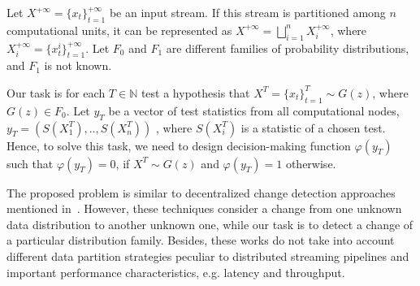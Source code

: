 \label {fs-short-model}

Let $X^{+\infty}=\{x_t\}_{t=1}^{+\infty}$ be an input stream. If this stream is partitioned among $n$ computational units, it can be represented as $X^{+\infty}=\bigsqcup_{i=1}^n X_i^{+\infty}$, where $X_i^{+\infty}=\{x_t^i\}_{t=1}^{+\infty}$. Let $F_0$ and $F_1$ are different families of probability distributions, and $F_1$ is not known. 

Our task is for each $T\in \mathbb{N}$ test a hypothesis that $X^T=\{x_t\}_{t=1}^{T} \sim G(z)$, where $G(z) \in F_0$. Let $y_T$ be a vector of test statistics from all computational nodes,  $y_T = (S(X_1^T),..,S(X_n^T))$ , where $S(X_i^T)$ is a statistic of a chosen test. Hence, to solve this task, we need to design decision-making function $\varphi(y_T)$ such that $\varphi(y_T) = 0$, if $X^T \sim G(z)$  and $\varphi(y_T) = 1$ otherwise.

The proposed problem is similar to decentralized change detection approaches mentioned in~\cite{tartakovsky2008asymptotically, tran2014change}. However, these techniques consider a change from one unknown data distribution to another unknown one, while our task is to detect a change of a particular distribution family. Besides, these works do not take into account different data partition strategies peculiar to distributed streaming pipelines and important performance characteristics, e.g. latency and throughput.